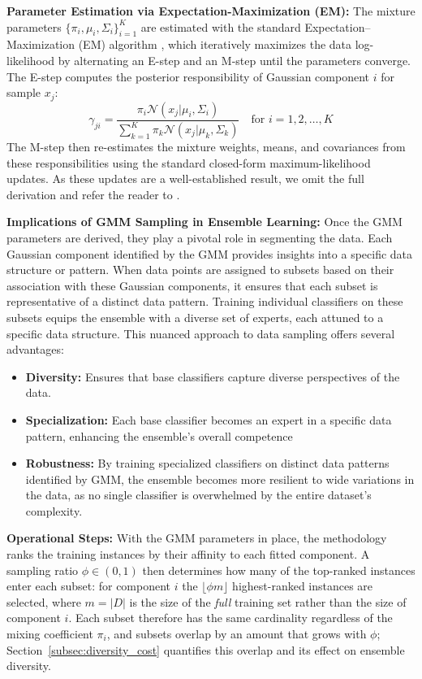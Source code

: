 \documentclass[lettersize,journal]{IEEEtran}
\begin{document}
		\textbf{Parameter Estimation via Expectation-Maximization (EM):}
		The mixture parameters $\{\pi_i, \mu_i, \Sigma_i\}_{i=1}^{K}$ are estimated with the standard Expectation--Maximization (EM) algorithm \cite{dempster_maximum_1977}, which iteratively maximizes the data log-likelihood by alternating an E-step and an M-step until the parameters converge. The E-step computes the posterior responsibility of Gaussian component $i$ for sample $x_j$:
		\begin{equation}\label{eq:E-Step}
			\gamma_{ji} = \frac{\pi_i \mathcal{N}(x_j | \mu_i, \Sigma_i)}{\sum_{k=1}^{K} \pi_k \mathcal{N}(x_j | \mu_k, \Sigma_k)} \quad \text{for } i = 1, 2, \dots, K
		\end{equation}
		The M-step then re-estimates the mixture weights, means, and covariances from these responsibilities using the standard closed-form maximum-likelihood updates. As these updates are a well-established result, we omit the full derivation and refer the reader to \cite{dempster_maximum_1977}.
	
	\textbf{Implications of GMM Sampling in Ensemble Learning:} Once the
	GMM parameters are derived, they play a pivotal role in segmenting the data.
	Each Gaussian component identified by the GMM provides insights into a
	specific data structure or pattern. When data points are assigned to subsets
	based on their association with these Gaussian components, it ensures that
	each subset is representative of a distinct data pattern. Training individual
	classifiers on these subsets equips the ensemble with a diverse set of experts,
	each attuned to a specific data structure. This nuanced approach to data sampling offers several advantages:
	\begin{itemize}
		\item \textbf{Diversity:} Ensures that base classifiers capture diverse perspectives of the data.
		\item \textbf{Specialization:} Each base classifier becomes an expert in a specific
		data pattern, enhancing the ensemble’s overall competence
		\item \textbf{Robustness:} By training specialized classifiers on distinct data patterns identified by GMM, the ensemble becomes more resilient to wide variations in the data, as no single classifier is overwhelmed by the entire dataset's complexity.
	\end{itemize}
	\textbf{Operational Steps:} With the GMM parameters in place, the methodology ranks
	the training instances by their affinity to each fitted component. A
	sampling ratio $\phi \in (0,1)$ then determines how many of the top-ranked instances
	enter each subset: for component $i$ the $\lfloor \phi m \rfloor$ highest-ranked
	instances are selected, where $m = |D|$ is the size of the \emph{full} training set
	rather than the size of component $i$. Each subset therefore has the same cardinality
	regardless of the mixing coefficient $\pi_i$, and subsets overlap by an amount that
	grows with $\phi$; Section~\ref{subsec:diversity_cost} quantifies this overlap and its
	effect on ensemble diversity.
\end{document}
